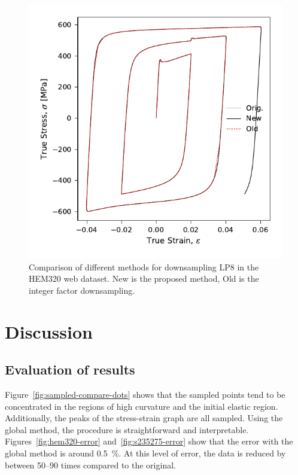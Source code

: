 \documentclass[a4paper,11pt]{article}
\begin{document}
\begin{figure}
    \centering
    \includegraphics{LP8_WP3_HEM320_C_CRM20.pdf}
    \caption{Comparison of different methods for downsampling LP8 in the HEM320 web dataset. New is the proposed method, Old is the integer factor downsampling.}
    \label{fig:hem320-lp8-compare-methods}
\end{figure}


\section{Discussion}

\subsection{Evaluation of results}

Figure~\ref{fig:sampled-compare-dots} shows that the sampled points tend to be concentrated in the regions of high curvature and the initial elastic region.
Additionally, the peaks of the stress-strain graph are all sampled.
Using the global method, the procedure is straightforward and interpretable.
Figures~\ref{fig:hem320-error} and~\ref{fig:s235275-error} show that the error with the global method is around 0.5~\%.
At this level of error, the data is reduced by between 50--90 times compared to the original.
\end{document}
